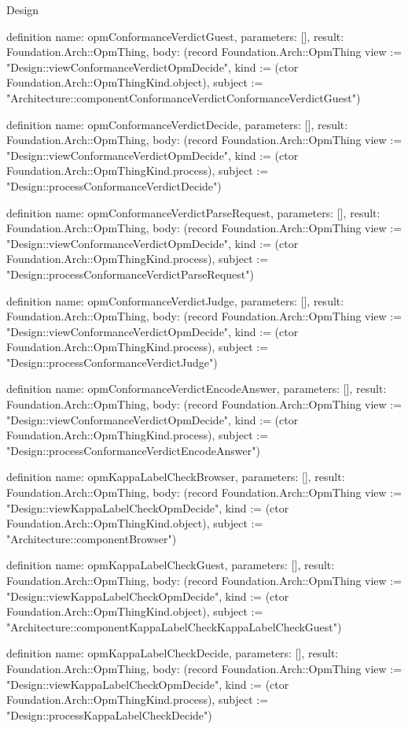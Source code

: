\begin{lexlean}{Design}
\begin{semanticmodule}
definition{
  name: opmConformanceVerdictGuest,
  parameters: [],
  result: Foundation.Arch::OpmThing,
  body: (record Foundation.Arch::OpmThing {view := "Design::viewConformanceVerdictOpmDecide", kind := (ctor Foundation.Arch::OpmThingKind.object), subject := "Architecture::componentConformanceVerdictConformanceVerdictGuest"})
}

definition{
  name: opmConformanceVerdictDecide,
  parameters: [],
  result: Foundation.Arch::OpmThing,
  body: (record Foundation.Arch::OpmThing {view := "Design::viewConformanceVerdictOpmDecide", kind := (ctor Foundation.Arch::OpmThingKind.process), subject := "Design::processConformanceVerdictDecide"})
}

definition{
  name: opmConformanceVerdictParseRequest,
  parameters: [],
  result: Foundation.Arch::OpmThing,
  body: (record Foundation.Arch::OpmThing {view := "Design::viewConformanceVerdictOpmDecide", kind := (ctor Foundation.Arch::OpmThingKind.process), subject := "Design::processConformanceVerdictParseRequest"})
}

definition{
  name: opmConformanceVerdictJudge,
  parameters: [],
  result: Foundation.Arch::OpmThing,
  body: (record Foundation.Arch::OpmThing {view := "Design::viewConformanceVerdictOpmDecide", kind := (ctor Foundation.Arch::OpmThingKind.process), subject := "Design::processConformanceVerdictJudge"})
}

definition{
  name: opmConformanceVerdictEncodeAnswer,
  parameters: [],
  result: Foundation.Arch::OpmThing,
  body: (record Foundation.Arch::OpmThing {view := "Design::viewConformanceVerdictOpmDecide", kind := (ctor Foundation.Arch::OpmThingKind.process), subject := "Design::processConformanceVerdictEncodeAnswer"})
}

definition{
  name: opmKappaLabelCheckBrowser,
  parameters: [],
  result: Foundation.Arch::OpmThing,
  body: (record Foundation.Arch::OpmThing {view := "Design::viewKappaLabelCheckOpmDecide", kind := (ctor Foundation.Arch::OpmThingKind.object), subject := "Architecture::componentBrowser"})
}

definition{
  name: opmKappaLabelCheckGuest,
  parameters: [],
  result: Foundation.Arch::OpmThing,
  body: (record Foundation.Arch::OpmThing {view := "Design::viewKappaLabelCheckOpmDecide", kind := (ctor Foundation.Arch::OpmThingKind.object), subject := "Architecture::componentKappaLabelCheckKappaLabelCheckGuest"})
}

definition{
  name: opmKappaLabelCheckDecide,
  parameters: [],
  result: Foundation.Arch::OpmThing,
  body: (record Foundation.Arch::OpmThing {view := "Design::viewKappaLabelCheckOpmDecide", kind := (ctor Foundation.Arch::OpmThingKind.process), subject := "Design::processKappaLabelCheckDecide"})
}


\end{semanticmodule}
\end{lexlean}
